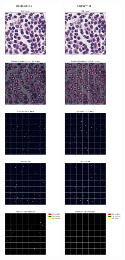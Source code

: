 \begin{figure}[H]
    \centering
    \includegraphics[width=0.276\textwidth, valign=b]{figures/tils/TCGA-D8-A142-01Z-00-DX12_F1_deeplabv3+_adj.png}
    \includegraphics[width=0.276\textwidth, valign=b]{figures/tils/TCGA-D8-A142-01Z-00-DX12_F1_segformer_adj.png}

\end{figure}
